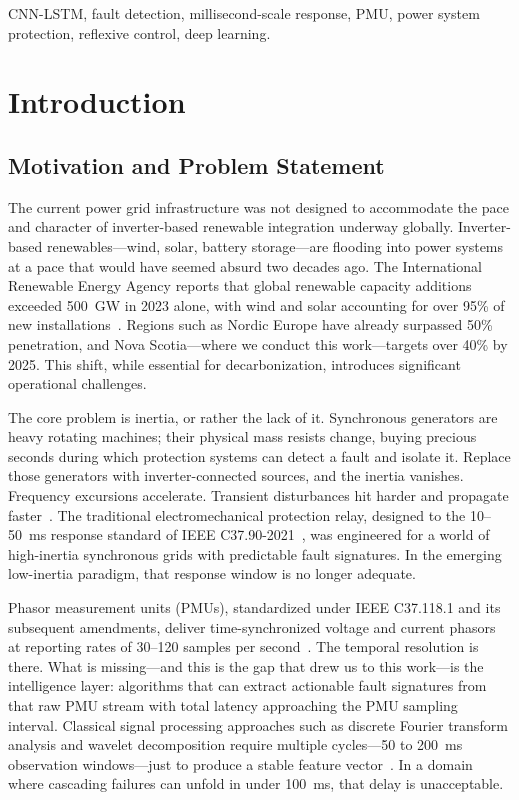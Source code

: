 \documentclass[journal]{IEEEtran}
\begin{document}
\begin{IEEEkeywords}
CNN-LSTM, fault detection, millisecond-scale response, PMU, power system protection, reflexive control, deep learning.
\end{IEEEkeywords}

\section{Introduction}
\label{sec:intro}

\subsection{Motivation and Problem Statement}

The current power grid infrastructure was not designed to accommodate the pace and character of inverter-based renewable integration underway globally. Inverter-based renewables---wind, solar, battery storage---are flooding into power systems at a pace that would have seemed absurd two decades ago. The International Renewable Energy Agency reports that global renewable capacity additions exceeded 500~GW in 2023 alone, with wind and solar accounting for over 95\% of new installations~\cite{ref1}. Regions such as Nordic Europe have already surpassed 50\% penetration, and Nova Scotia---where we conduct this work---targets over 40\% by 2025. This shift, while essential for decarbonization, introduces significant operational challenges.

The core problem is inertia, or rather the lack of it. Synchronous generators are heavy rotating machines; their physical mass resists change, buying precious seconds during which protection systems can detect a fault and isolate it. Replace those generators with inverter-connected sources, and the inertia vanishes. Frequency excursions accelerate. Transient disturbances hit harder and propagate faster~\cite{ref2}. The traditional electromechanical protection relay, designed to the 10--50~ms response standard of IEEE C37.90-2021~\cite{ref3}, was engineered for a world of high-inertia synchronous grids with predictable fault signatures. In the emerging low-inertia paradigm, that response window is no longer adequate.

Phasor measurement units (PMUs), standardized under IEEE C37.118.1 and its subsequent amendments, deliver time-synchronized voltage and current phasors at reporting rates of 30--120 samples per second~\cite{ref4}. The temporal resolution is there. What is missing---and this is the gap that drew us to this work---is the intelligence layer: algorithms that can extract actionable fault signatures from that raw PMU stream with total latency approaching the PMU sampling interval. Classical signal processing approaches such as discrete Fourier transform analysis and wavelet decomposition require multiple cycles---50 to 200~ms observation windows---just to produce a stable feature vector~\cite{ref5}. In a domain where cascading failures can unfold in under 100~ms, that delay is unacceptable.
\end{document}
